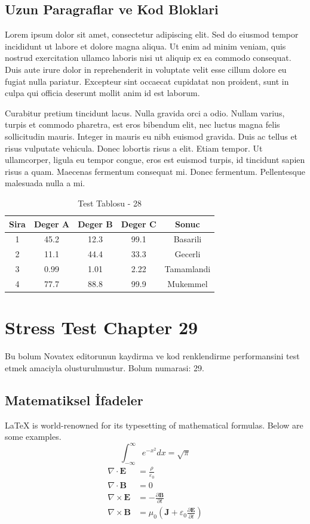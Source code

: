 \documentclass[12pt,a4paper]{article}
\begin{document}
\subsection{Uzun Paragraflar ve Kod Bloklari}
Lorem ipsum dolor sit amet, consectetur adipiscing elit. Sed do eiusmod tempor incididunt ut labore et dolore magna aliqua. Ut enim ad minim veniam, quis nostrud exercitation ullamco laboris nisi ut aliquip ex ea commodo consequat. Duis aute irure dolor in reprehenderit in voluptate velit esse cillum dolore eu fugiat nulla pariatur. Excepteur sint occaecat cupidatat non proident, sunt in culpa qui officia deserunt mollit anim id est laborum.

Curabitur pretium tincidunt lacus. Nulla gravida orci a odio. Nullam varius, turpis et commodo pharetra, est eros bibendum elit, nec luctus magna felis sollicitudin mauris. Integer in mauris eu nibh euismod gravida. Duis ac tellus et risus vulputate vehicula. Donec lobortis risus a elit. Etiam tempor. Ut ullamcorper, ligula eu tempor congue, eros est euismod turpis, id tincidunt sapien risus a quam. Maecenas fermentum consequat mi. Donec fermentum. Pellentesque malesuada nulla a mi.

\begin{table}[h!]
\centering
\begin{tabular}{|c|c|c|c|c|}
\hline
\textbf{Sira} & \textbf{Deger A} & \textbf{Deger B} & \textbf{Deger C} & \textbf{Sonuc} \\
\hline
1 & 45.2 & 12.3 & 99.1 & Basarili \\
2 & 11.1 & 44.4 & 33.3 & Gecerli \\
3 & 0.99 & 1.01 & 2.22 & Tamamlandi \\
4 & 77.7 & 88.8 & 99.9 & Mukemmel \\
\hline
\end{tabular}
\caption{Test Tablosu - 28}
\end{table}

\newpage
\section{Stress Test Chapter 29}
Bu bolum Novatex editorunun kaydirma ve kod renklendirme performansini test etmek amaciyla olusturulmustur. Bolum numarasi: 29.

\subsection{Matematiksel İfadeler}
\LaTeX{} is world-renowned for its typesetting of mathematical formulas. Below are some examples.
\begin{equation}
\int_{-\infty}^{\infty} e^{-x^2} dx = \sqrt{\pi}
\end{equation}
\begin{align}
\nabla \cdot \mathbf{E} &= \frac{\rho}{\varepsilon_0} \\
\nabla \cdot \mathbf{B} &= 0 \\
\nabla \times \mathbf{E} &= -\frac{\partial \mathbf{B}}{\partial t} \\
\nabla \times \mathbf{B} &= \mu_0\left(\mathbf{J} + \varepsilon_0 \frac{\partial \mathbf{E}}{\partial t}\right)
\end{align}
\end{document}
